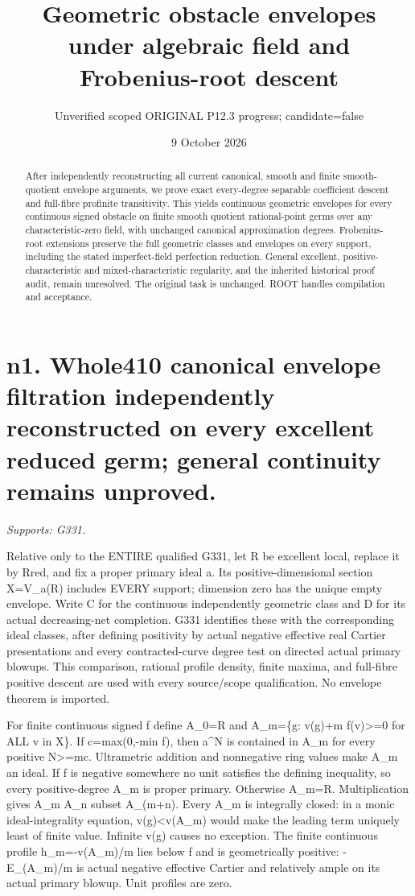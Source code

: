 \documentclass[11pt]{article}
\title{Geometric obstacle envelopes under algebraic field and Frobenius-root descent}
\author{Unverified scoped ORIGINAL P12.3 progress; candidate=false}
\date{9 October 2026}
\begin{document}
\maketitle
\begin{abstract}
After independently reconstructing all current canonical, smooth and finite
smooth-quotient envelope arguments, we prove exact every-degree separable
coefficient descent and full-fibre profinite transitivity. This yields
continuous geometric envelopes for every continuous signed obstacle on
finite smooth quotient rational-point germs over any characteristic-zero
field, with unchanged canonical approximation degrees. Frobenius-root
extensions preserve the full geometric classes and envelopes on every
support, including the stated imperfect-field perfection reduction.
General excellent, positive-characteristic and mixed-characteristic
regularity, and the inherited historical proof audit, remain unresolved.
The original task is unchanged. ROOT handles compilation and acceptance.
\end{abstract}
\tableofcontents
\newpage
\section{n1. Whole410 canonical envelope filtration independently reconstructed on every excellent reduced germ; general continuity remains unproved.}
\textit{Supports: G331.}

Relative only to the ENTIRE qualified G331, let R be excellent local, replace it by Rred, and fix a proper primary ideal a. Its positive-dimensional section X=V\_a(R) includes EVERY support; dimension zero has the unique empty envelope. Write C for the continuous independently geometric class and D for its actual decreasing-net completion. G331 identifies these with the corresponding ideal classes, after defining positivity by actual negative effective real Cartier presentations and every contracted-curve degree test on directed actual primary blowups. This comparison, rational profile density, finite maxima, and full-fibre positive descent are used with every source/scope qualification. No envelope theorem is imported.

For finite continuous signed f define A\_0=R and A\_m=\{g: v(g)+m f(v)\textgreater{}=0 for ALL v in X\}. If c=max(0,-min f), then a\textasciicircum{}N is contained in A\_m for every positive N\textgreater{}=mc. Ultrametric addition and nonnegative ring values make A\_m an ideal. If f is negative somewhere no unit satisfies the defining inequality, so every positive-degree A\_m is proper primary. Otherwise A\_m=R. Multiplication gives A\_m A\_n subset A\_(m+n). Every A\_m is integrally closed: in a monic ideal-integrality equation, v(g)\textless{}v(A\_m) would make the leading term uniquely least of finite value. Infinite v(g) causes no exception. The finite continuous profile h\_m=-v(A\_m)/m lies below f and is geometrically positive: -E\_(A\_m)/m is actual negative effective Cartier and relatively ample on its actual primary blowup. Unit profiles are zero.
\end{document}
